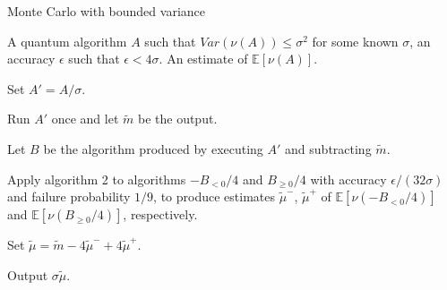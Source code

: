 \documentclass{article}
\begin{document}
\pagestyle{empty}

\begin{algorithm}[ht]
	\caption{Monte Carlo with bounded variance}
	\begin{algorithmic}[1]

		\Require  A quantum algorithm $A$ such that $Var(\nu(A))\leq \sigma^2$ for some known $\sigma$, an accuracy $\epsilon$ such that $\epsilon<4\sigma$.
		\Ensure An estimate of $\mathbb{E}[\nu(A)]$.
		\vspace{10pt}
		\Statex

		\State Set $A'=A/\sigma$.

		\State Run $A'$ once and let $\widetilde{m}$ be the output.

		 \State Let $B$ be the algorithm produced by executing $A'$ and subtracting $\widetilde{m}$.

	 \State Apply algorithm 2 to algorithms $-B_{<0}/4$ and $B_{\geq 0}/4$ with accuracy $\epsilon/(32\sigma)$ and failure probability $1/9$, to produce estimates $\widetilde{\mu}^-$, $\widetilde{\mu}^+$ of $\mathbb{E}[\nu(-B_{<0}/4)]$ and $\mathbb{E}[\nu(B_{\geq 0}/4)]$, respectively.

		\State Set $\widetilde{\mu}= \widetilde{m}-4\widetilde{\mu}^-+4\widetilde{\mu}^+$.

		\State Output $\sigma \widetilde{\mu}$.

	\end{algorithmic}
\end{algorithm}
\end{document}
